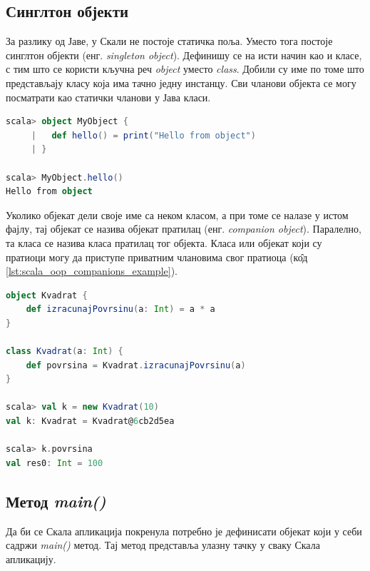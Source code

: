 \documentclass[12pt,oneside]{memoir}
\begin{document}
\subsection{Синглтон објекти}
\label{subsec:scala_sing_obj}

За разлику од Јаве, у Скали не постоје статичка поља. Уместо тога постоје синглтон објекти (енг. \textit{singleton object}). Дефинишу се на исти начин као и класе, с тим што се користи кључна реч \textit{object} уместо \textit{class}. Добили су име по томе што представљају класу која има тачно једну инстанцу. Сви чланови објекта се могу посматрати као статички чланови у Јава класи. \cite{scala_prog}

\begin{lstlisting}[language=Scala, caption={Коришћење синглтон објекта}, label={lst:scala_oop_object_example}]
scala> object MyObject {
     |   def hello() = print("Hello from object")
     | }

scala> MyObject.hello()
Hello from object
\end{lstlisting}

Уколико објекат дели своје име са неком класом, а при томе се налазе у истом фајлу, тај објекат се назива објекат пратилац (енг. \textit{companion object}). Паралелно, та класа се назива класа пратилац тог објекта. Класа или објекат који су пратиоци могу да приступе приватним члановима свог пратиоца (к\^ {о}д \ref{lst:scala_oop_companions_example}). \cite{scala_prog}

\begin{lstlisting}[language=Scala, caption={Пример пратиоца}, label={lst:scala_oop_companions_example}]
object Kvadrat {
    def izracunajPovrsinu(a: Int) = a * a
}

class Kvadrat(a: Int) {
    def povrsina = Kvadrat.izracunajPovrsinu(a)
}

scala> val k = new Kvadrat(10)
val k: Kvadrat = Kvadrat@6cb2d5ea

scala> k.povrsina
val res0: Int = 100

\end{lstlisting}

\subsection{Метод \textit{main()}}
\label{subsec:scala_oop_main_app}

Да би се Скала апликација покренула потребно је дефинисати објекат који у себи садржи \textit{main()} метод. Тај метод представља улазну тачку у сваку Скала апликацију. \cite{scala_prog}
\end{document}
